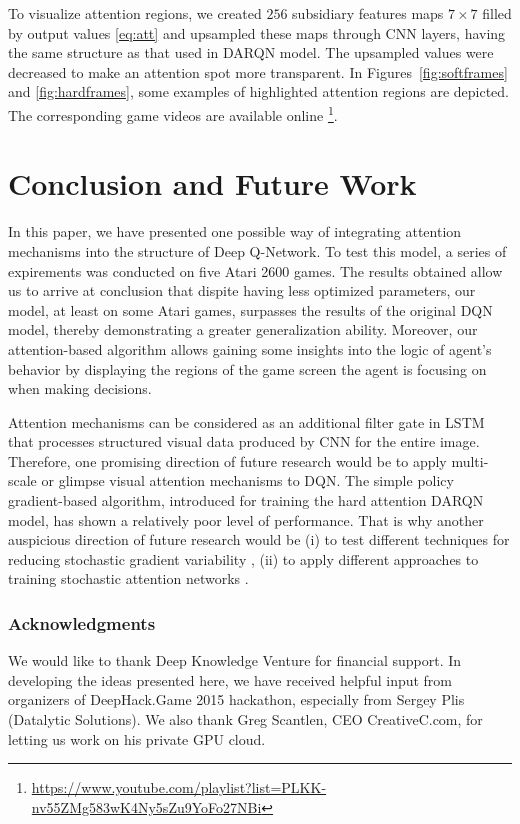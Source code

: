 \documentclass{article} \usepackage{nips15submit_e,times}
\begin{document}
To visualize attention regions, we created $256$ subsidiary features maps $7\times7$ filled by output values \eqref{eq:att} and upsampled these maps through CNN layers, having the same structure as that used in DARQN model. The upsampled values were decreased to make an attention spot more transparent. In Figures~\ref{fig:softframes} and \ref{fig:hardframes}, some 
examples of highlighted attention regions are depicted. The corresponding game videos are available online \footnote{\url{https://www.youtube.com/playlist?list=PLKK-nv55ZMg583wK4Ny5sZu9YoFo27NBi}}.


\section{Conclusion and Future Work}
\label{sec:concl}

In this paper, we have presented one possible way of integrating attention mechanisms into the structure of Deep Q-Network. To test this model, a series of expirements was conducted on five Atari 2600 games. The results obtained allow us to arrive at conclusion that dispite having less optimized parameters, our model, at least on some Atari games, surpasses the results of the original DQN model, thereby demonstrating a greater generalization ability. Moreover, our attention-based algorithm allows gaining some insights into the logic of agent's behavior by displaying the regions of the game screen the agent is focusing on when making decisions.

Attention mechanisms can be considered as an additional filter gate in LSTM that processes structured visual data
produced by CNN for the entire image. Therefore, one promising direction of future research would be to apply multi-scale \cite{ba2015learning} or glimpse \cite{ba2015attention} visual attention mechanisms to DQN. The simple policy gradient-based algorithm, introduced for training the hard attention DARQN model, has shown a relatively poor level of performance. That is why another auspicious direction of future research would be (i) to test different techniques for reducing stochastic gradient variability \cite{schulman2015high}, (ii) to apply different approaches to training stochastic attention networks \cite{ba2015learning,schulman2015gradient}.

\subsubsection*{Acknowledgments}

We would like to thank Deep Knowledge Venture for financial support. In developing the ideas presented here, we have received helpful input from organizers of DeepHack.Game 2015 hackathon, especially from Sergey Plis (Datalytic Solutions). We also thank Greg Scantlen, CEO CreativeC.com, for letting us work on his private GPU cloud.

{}

\end{document}
